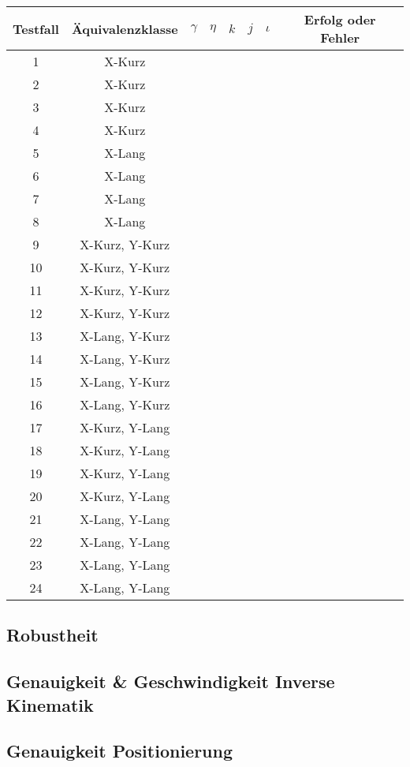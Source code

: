 \begin{center}
	\begin{longtable}{|c|c|c|c|c|c|c|c|}
		\hline
		Testfall & Äquivalenzklasse &$\gamma$ & $\eta$ & $k$ & $j$ & $\iota$ & Erfolg oder Fehler\\
		\hline
		1 & X-Kurz & & & & & & \checkmark\\
		2 & X-Kurz & & & & & & \checkmark\\
		3 & X-Kurz & & & & & & \checkmark\\
		4 & X-Kurz & & & & & & \checkmark\\
		5 & X-Lang & & & & & & \checkmark\\
		6 & X-Lang & & & & & & \checkmark\\
		7 & X-Lang & & & & & & \checkmark\\
		8 & X-Lang & & & & & & \checkmark\\
		9 & X-Kurz, Y-Kurz & & & & & & \checkmark\\
		10 & X-Kurz, Y-Kurz & & & & & & \checkmark\\
		11 & X-Kurz, Y-Kurz & & & & & & \checkmark\\
		12 & X-Kurz, Y-Kurz & & & & & & \checkmark\\
		13 & X-Lang, Y-Kurz & & & & & & \checkmark\\
		14 & X-Lang, Y-Kurz & & & & & & \checkmark\\
		15 & X-Lang, Y-Kurz & & & & & & \checkmark\\
		16 & X-Lang, Y-Kurz & & & & & & \checkmark\\
		17 & X-Kurz, Y-Lang & & & & & & \checkmark\\
		18 & X-Kurz, Y-Lang & & & & & & \checkmark\\
		19 & X-Kurz, Y-Lang & & & & & & \checkmark\\
		20 & X-Kurz, Y-Lang & & & & & & \checkmark\\
		21 & X-Lang, Y-Lang & & & & & & \checkmark\\
		22 & X-Lang, Y-Lang & & & & & & \checkmark\\
		23 & X-Lang, Y-Lang & & & & & & \checkmark\\
		24 & X-Lang, Y-Lang & & & & & & \checkmark\\
	\end{longtable}
\end{center}
\subsection{Robustheit}
\subsection{Genauigkeit \& Geschwindigkeit Inverse Kinematik}
\subsection{Genauigkeit Positionierung}
